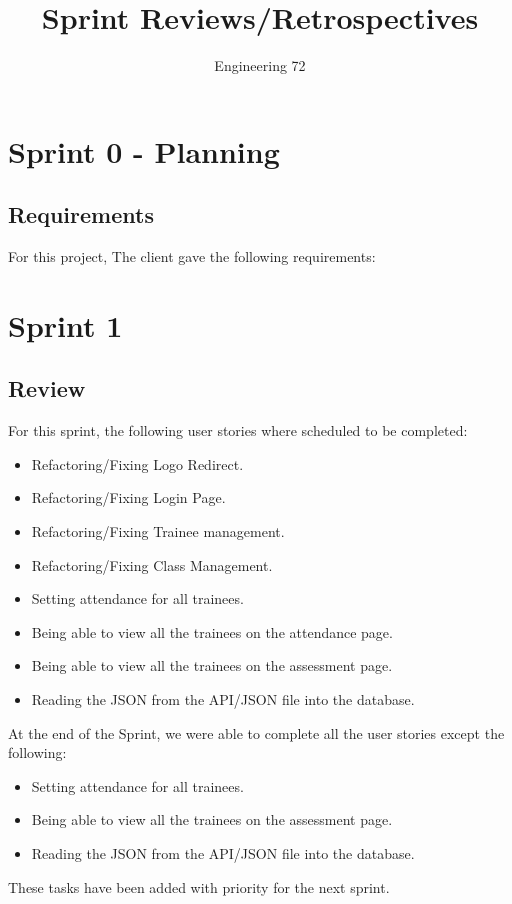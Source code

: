 \documentclass[]{report}
\title{Sprint Reviews/Retrospectives}
\author{Engineering 72}
\begin{document}
	\maketitle
	
	\tableofcontents
	
	\chapter*{Sprint 0 - Planning}
		\section*{Requirements}
			For this project, The client gave the following requirements:
		
	\chapter*{Sprint 1}
		\section*{Review}
			For this sprint, the following user stories where scheduled to be completed:
			\begin{itemize}
				\item Refactoring/Fixing Logo Redirect.
				\item Refactoring/Fixing Login Page.
				\item Refactoring/Fixing Trainee management.
				\item Refactoring/Fixing Class Management.
				\item Setting attendance for all trainees.
				\item Being able to view all the trainees on the attendance page.
				\item Being able to view all the trainees on the assessment page.
				\item Reading the JSON from the API/JSON file into the database.
			\end{itemize}
			At the end of the Sprint, we were able to complete all the user stories except the following:
			\begin{itemize}
				\item Setting attendance for all trainees.
				\item Being able to view all the trainees on the assessment page.
				\item Reading the JSON from the API/JSON file into the database.
			\end{itemize}
			These tasks have been added with priority for the next sprint.
\end{document}
